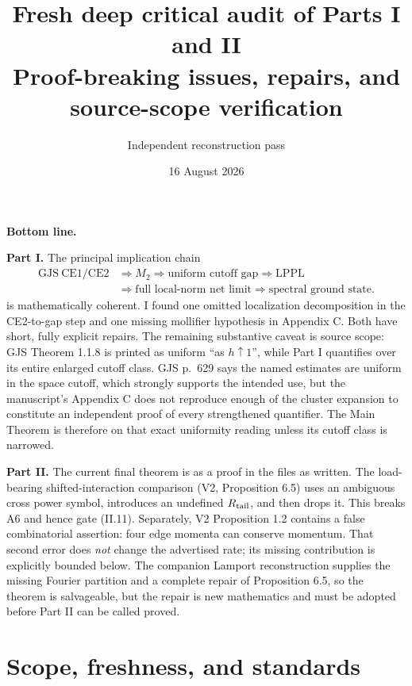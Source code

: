 \documentclass[11pt,a4paper]{article}
\title{Fresh deep critical audit of Parts I and II\\[3pt]
\large Proof-breaking issues, repairs, and source-scope verification}
\author{Independent reconstruction pass}
\date{16 August 2026}
\begin{document}
\maketitle

\begin{resultbox}
\textbf{Bottom line.}

\textbf{Part I.}  The principal implication chain
\[
 \begin{aligned}
 \mathrm{GJS\ CE1/CE2}&\Longrightarrow M_2\Longrightarrow
 \text{uniform cutoff gap}\Longrightarrow\text{LPPL}\\
 &\Longrightarrow\text{full local-norm net limit}
 \Longrightarrow\text{spectral ground state}.
 \end{aligned}
\]
is mathematically coherent.  I found one omitted localization decomposition in the
CE2-to-gap step and one missing mollifier hypothesis in Appendix C.  Both have short,
fully explicit repairs.  The remaining substantive caveat is source scope: GJS
Theorem 1.1.8 is printed as uniform ``as $h\uparrow1$'', while Part I quantifies over
its entire enlarged cutoff class.  GJS p.~629 says the named estimates are uniform in
the space cutoff, which strongly supports the intended use, but the manuscript's
Appendix C does not reproduce enough of the cluster expansion to constitute an
independent proof of every strengthened quantifier.  The Main Theorem is therefore
\Conditional{} on that exact uniformity reading unless its cutoff class is narrowed.

\textbf{Part II.}  The current final theorem is \Fail{} as a proof in the files as
written.  The load-bearing shifted-interaction comparison (V2, Proposition 6.5) uses
an ambiguous cross power symbol, introduces an undefined $R_{\rm tail}$, and then
drops it.  This breaks A6 and hence gate (II.11).  Separately, V2 Proposition 1.2
contains a false combinatorial assertion: four edge momenta can conserve momentum.
That second error does \emph{not} change the advertised rate; its missing contribution
is explicitly bounded below.  The companion Lamport reconstruction supplies the
missing Fourier partition and a complete repair of Proposition 6.5, so the theorem is
salvageable, but the repair is new mathematics and must be adopted before Part II can
be called proved.
\end{resultbox}

\tableofcontents

\section{Scope, freshness, and standards}
\end{document}
